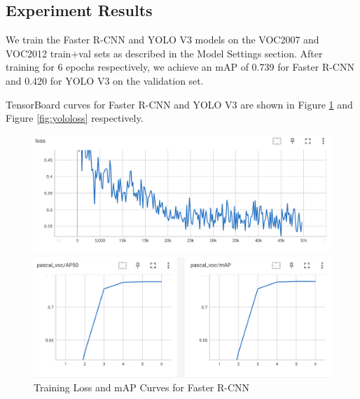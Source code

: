 \documentclass[UTF8]{ctexart}
\begin{document}
\subsection{Experiment Results}
We train the Faster R-CNN and YOLO V3 models on the VOC2007 and VOC2012 train+val sets as described in the Model Settings section.
After training for 6 epochs respectively, we achieve an mAP of 0.739 for Faster R-CNN and 0.420 for YOLO V3 on the validation set.

TensorBoard curves for Faster R-CNN and YOLO V3 are shown in Figure \ref{fig:fasterloss} and Figure \ref{fig:yololoss} respectively.

\begin{figure}[H]
    \centering
    \begin{minipage}{0.45\textwidth}
        \centering
        \includegraphics[width=\textwidth]{figs/TensorBoard/VOC_faster-rcnn/faster-rcnn_loss.png}
    \end{minipage}
    \hfill
    \begin{minipage}{0.45\textwidth}
        \centering
        \includegraphics[width=\textwidth]{figs/TensorBoard/VOC_faster-rcnn/faster-rcnn_mAP.png}
    \end{minipage}
    \caption{Training Loss and mAP Curves for Faster R-CNN}
    \label{fig:fasterloss}
\end{figure}
\end{document}
